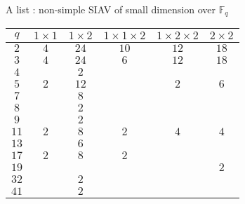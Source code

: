 \documentclass[usenames,dvipsnames,handout]{beamer}
\def\F{\mathbb{F}}
\begin{document}
\begin{frame}{ A list : non-simple SIAV of small dimension over $\F_q$ }
    \begin{table}[!ht]
  \begin{center}
  \begin{tabular}{|c||c|c|c|c|c|}\hline
  $q$ & $1 \times 1$ & $1 \times 2$ & $1 \times 1 \times 2$ & $1 \times 2 \times 2$ & $2 \times 2$ \\\hline\hline
  $2$ & $4$ & $24$ & $10$ & $12$ & $18$ \\\hline
  $3$ & $4$ & $24$ & $6$ & $12$ & $18$ \\\hline
  $4$ & $ $ & $2$ & $ $ & $ $ & $ $ \\\hline
  $5$ & $2$ & $12$ & $ $ & $2$ & $6$ \\\hline
  $7$ & $ $ & $8$ & $ $ & $ $ & $ $ \\\hline
  $8$ & $ $ & $2$ & $ $ & $ $ & $ $ \\\hline
  $9$ & $ $ & $2$ & $ $ & $ $ & $ $ \\\hline
  $11$ & $2$ & $8$ & $2$ & $4$ & $4$ \\\hline
  $13$ & $ $ & $6$ & $ $ & $ $ & $ $ \\\hline
  $17$ & $2$ & $8$ & $2$ & $ $ & $ $ \\\hline
  $19$ & $ $ & $ $ & $ $ & $ $ & $2$ \\\hline
  $32$ & $ $ & $2$ & $ $ & $ $ & $ $ \\\hline
  $41$ & $ $ & $2$ & $ $ & $ $ & $ $ \\\hline
  \end{tabular}
  \end{center}
\end{table}
\end{frame}
\end{document}
